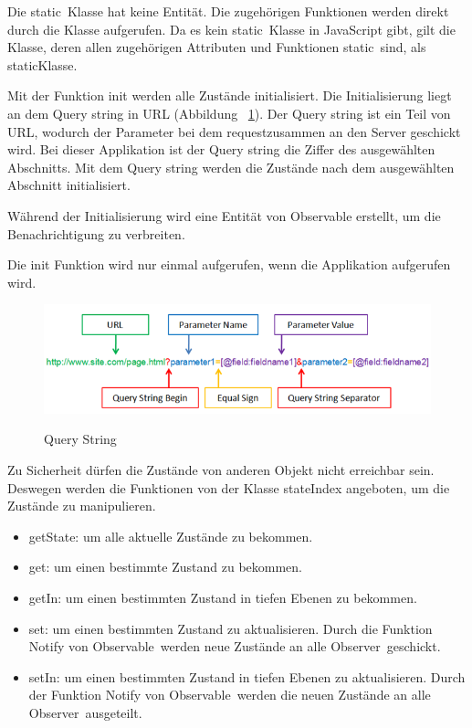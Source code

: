   Die \glqq static\grqq\ Klasse hat keine Entität. Die zugehörigen Funktionen werden direkt durch die Klasse aufgerufen. Da es kein \glqq static\grqq\ Klasse in JavaScript gibt, gilt die Klasse, deren allen zugehörigen Attributen und Funktionen \glqq static\grqq\ sind, als \glqq static\grqq Klasse.
  
  Mit der Funktion {\selectfont init}  werden alle Zustände initialisiert. Die Initialisierung liegt an dem Query string in URL (Abbildung ~\ref{fig:queryString}). Der Query string ist ein Teil von URL, wodurch der Parameter bei dem \glqq request\grqq zusammen an den Server geschickt wird. Bei dieser Applikation ist der Query string die Ziffer des ausgewählten Abschnitts. Mit dem Query string werden die Zustände nach dem ausgewählten Abschnitt initialisiert.
  
  Während der Initialisierung wird eine Entität von {\selectfont Observable} erstellt, um die Benachrichtigung zu verbreiten.
  
  Die {\selectfont init} Funktion wird nur einmal aufgerufen, wenn die Applikation aufgerufen wird.
  
\begin{figure}[ht]
\centering
\caption[Query String]{Query String}
\includegraphics[width=\textwidth]{images/queryString.png}
\label{fig:queryString} 
\end{figure}
  
  Zu Sicherheit dürfen die Zustände von anderen Objekt nicht erreichbar sein. Deswegen werden die Funktionen von der Klasse {\selectfont stateIndex} angeboten, um die Zustände zu manipulieren.
  
  \begin{itemize}
      \item {\selectfont getState}: um alle aktuelle Zustände zu bekommen.
      \item {\selectfont get}: um einen bestimmte Zustand zu bekommen.
      \item {\selectfont getIn}: um einen bestimmten Zustand in tiefen Ebenen zu bekommen.
      \item {\selectfont set}: um einen bestimmten Zustand zu aktualisieren. Durch die Funktion {\selectfont Notify} von \glqq Observable\grqq\ werden neue Zustände an alle \glqq Observer\grqq\ geschickt.
      \item {\selectfont setIn}: um einen bestimmten Zustand in tiefen Ebenen zu aktualisieren. Durch der Funktion {\selectfont Notify} von \glqq Observable\grqq\ werden die neuen Zustände an alle \glqq Observer\grqq\ ausgeteilt.
  \end{itemize}
  
